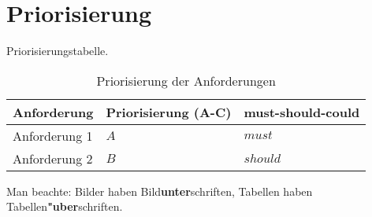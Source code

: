 \subsection{} %
\label{sse:}
\subsubsection{} %
\label{sss:}
\section{Priorisierung} %
\label{sec:} %
Priorisierungstabelle.
\FloatBarrier
\begin{table}
	\begin{center}
		\caption{Priorisierung der Anforderungen}
		\label{matrizen}
		\begin{tabular}{|l|l|l|}
			\hline
			Anforderung & Priorisierung (A-C) & must-should-could\\
			\hline
			Anforderung 1 & $ A $ & $must$   \\
			\hline
			Anforderung 2 & $ B $ & $should$  \\
			\hline
		\end{tabular}
	\end{center}
\end{table}
\FloatBarrier
Man beachte: Bilder haben Bild{\bf unter}schriften, 
Tabellen haben Tabellen{\bf "uber}schriften.